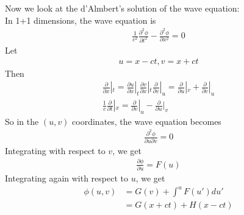 \documentclass[a4paper]{article}
\begin{document}
Now we look at the d'Almbert's solution of the wave equation:\\
In 1+1 dimensions, the wave equation is 
\begin{equation*}
\begin{aligned}
\frac{1}{c^2} \frac{\partial^2 \phi}{\partial t^2} - \frac{\partial^2 \phi}{\partial x^2}= 0
\end{aligned}
\end{equation*}
Let
\begin{equation*}
\begin{aligned}
u=x-ct,v=x+ct
\end{aligned}
\end{equation*}
Then
\begin{equation*}
\begin{aligned}
\frac{\partial}{\partial x}|_t = \frac{\partial u}{\partial x}|_t \frac{\partial v}{\partial x}|_t \frac{\partial}{\partial v}|_u = \frac{\partial}{\partial u}|_v + \frac{\partial}{\partial v}|_u\\
\frac{1}{c}\frac{\partial}{\partial t}|_x = \frac{\partial}{\partial v}|_u - \frac{\partial}{\partial u}|_v
\end{aligned}
\end{equation*}
So in the $\left(u,v\right)$ coordinates, the wave equation becomes
\begin{equation*}
\begin{aligned}
\frac{\partial^2\phi}{\partial u\partial v} = 0
\end{aligned}
\end{equation*}
Integrating with respect to $v$, we get
\begin{equation*}
\begin{aligned}
\frac{\partial \phi}{\partial u} = F\left(u\right)
\end{aligned}
\end{equation*}
Integrating again with respect to $u$, we get
\begin{equation*}
\begin{aligned}
\phi\left(u,v\right) &= G\left(v\right) + \int^u F\left(u'\right)du'\\
&= G\left(x+ct\right) + H\left(x-ct\right)
\end{aligned}
\end{equation*}
\end{document}
